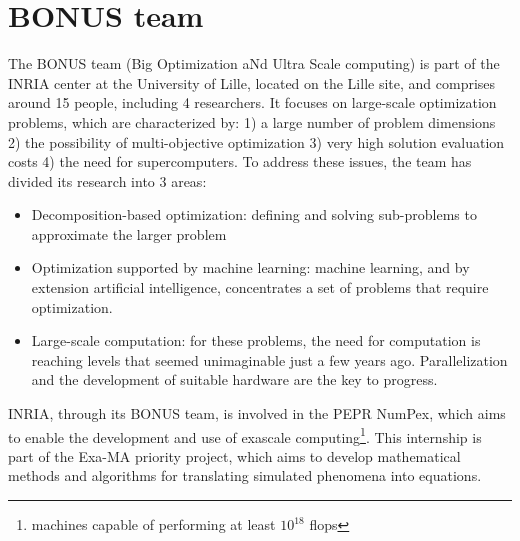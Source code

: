 \section{BONUS team}

The BONUS team (Big Optimization aNd Ultra Scale computing) is part of the INRIA center at the University of Lille, located on the Lille site, and comprises around 15 people, including 4 researchers. It focuses on large-scale optimization problems, which are characterized by: 1) a large number of problem dimensions 2) the possibility of multi-objective optimization 3) very high solution evaluation costs 4) the need for supercomputers.
To address these issues, the team has divided its research into 3 areas:
\begin{itemize}
  \item Decomposition-based optimization: defining and solving sub-problems to approximate the larger problem
    \item Optimization supported by machine learning: machine learning, and by extension artificial intelligence, concentrates a set of problems that require optimization.
    \item Large-scale computation: for these problems, the need for computation is reaching levels that seemed unimaginable just a few years ago. Parallelization and the development of suitable hardware are the key to progress.
\end{itemize}

INRIA, through its BONUS team, is involved in the PEPR NumPex\cite{numpex}, which aims to enable the development and use of exascale computing\footnote{machines capable of performing at least $10^{18}$ \acrshort{flops}}. This internship is part of the Exa-MA priority project, which aims to develop mathematical methods and algorithms for translating simulated phenomena into equations.
